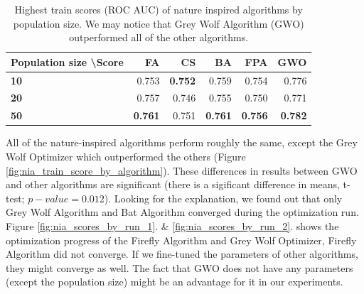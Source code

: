 \documentclass[runningheads]{llncs}
\begin{document}
\def\arraystretch{1.5}
\begin{table}
	\begin{center}
		\caption{Highest train scores (ROC AUC) of nature inspired algorithms by population size. We may notice that Grey Wolf Algorithm (GWO) outperformed all of the other algorithms.} \label{tab:nia_comparison}
	\end{center}
	\begin{center}
		\begin{tabular}{|l|r|r|r|r|r|}
			\hline
			\textbf{Population size \textbackslash Score} & \multicolumn{1}{r|}{\textbf{FA}} & \multicolumn{1}{r|}{\textbf{CS}} & \multicolumn{1}{r|}{\textbf{BA}} & \multicolumn{1}{r|}{\textbf{FPA}} & \multicolumn{1}{r|}{\textbf{GWO}} \\ \hline
			\textbf{10}                                             & 0.753                           & \textbf{0.752}                           & 0.759                           & 0.754                            & 0.776                             \\
			\textbf{20}                                             & 0.757                           & 0.746                           & 0.755                           & 0.750                            & 0.771                             \\
			\textbf{50}                                             & \textbf{0.761}                           & 0.751                           & \textbf{0.761}                           & \textbf{0.756}                            & \textbf{0.782}                             \\ \hline
		\end{tabular}
	\end{center}
\end{table}

All of the nature-inspired algorithms perform roughly the same, except the Grey Wolf Optimizer which outperformed the others (Figure \ref{fig:nia_train_score_by_algorithm}). These differences in results between GWO and other algorithms are significant (there is a sigificant difference in means, t-test; $p-value=0.012$). Looking for the explanation, we found out that only Grey Wolf Algorithm and Bat Algorithm converged during the optimization run. Figure \ref{fig:nia_scores_by_run_1}. \& \ref{fig:nia_scores_by_run_2}. shows the optimization progress of the Firefly Algorithm and Grey Wolf Optimizer, Firefly Algorithm did not converge. If we fine-tuned the parameters of other algorithms, they might converge as well. The fact that GWO does not have any parameters (except the population size) might be an advantage for it in our experiments.
\end{document}
